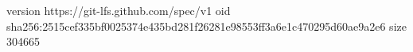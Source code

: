 version https://git-lfs.github.com/spec/v1
oid sha256:2515cef335bf0025374e435bd281f26281e98553ff3a6e1c470295d60ae9a2e6
size 304665
